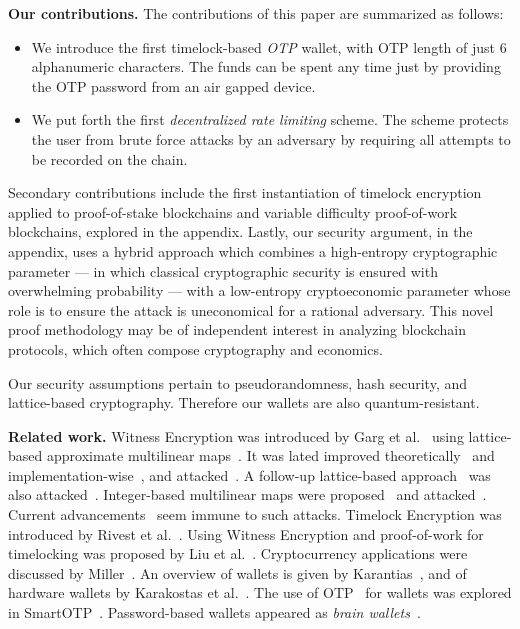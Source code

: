\noindent
\textbf{Our contributions.}
The contributions of this paper are summarized as follows:

\begin{itemize}
  \item We introduce the first timelock-based \emph{OTP} wallet, with OTP length of
        just 6 alphanumeric characters. The funds can be spent any time just by
        providing the OTP password from an air gapped device.
  \item We put forth the first
        \emph{decentralized rate limiting} scheme. The scheme protects the user
        from brute force attacks by an adversary by requiring all attempts to
        be recorded on the chain.
\end{itemize}

Secondary contributions include the first instantiation of timelock encryption applied
to proof-of-stake blockchains and variable difficulty proof-of-work blockchains, explored
in the appendix. Lastly,
our security argument, in the appendix, uses a hybrid approach which combines a high-entropy
cryptographic parameter --- in which classical cryptographic security is ensured with overwhelming
probability --- with a low-entropy cryptoeconomic parameter whose role is to ensure the
attack is uneconomical for a rational adversary. This novel proof methodology may be of
independent interest in analyzing blockchain protocols, which often compose cryptography
and economics.

Our security assumptions pertain to pseudorandomness, hash security, and lattice-based cryptography.
Therefore our wallets are also quantum-resistant.

\noindent
\textbf{Related work.}
Witness Encryption was introduced by Garg et al.~\cite{STOC:GGSW13}
using lattice-based approximate multilinear
maps~\cite{EC:GarGenHal13}. It was lated
improved theoretically~\cite{EC:LanSteSte14} and implementation-wise~\cite{AC:ACLL15},
and attacked~\cite{EC:CHLRS15,EC:HuJia16,PKC:CLLT17,C:CGHLMM15,C:AlbBaiDuc16,EPRINT:CheJeoLee16}.
A follow-up lattice-based approach~\cite{TCC:GenGorHal15} was also attacked~\cite{C:CLLT16}.
Integer-based multilinear maps were proposed~\cite{C:CorLepTib13,C:CorLepTib15} and
attacked~\cite{EC:CHLRS15,EPRINT:MinFou15,EPRINT:CheLeeRyu15}.
Current advancements~\cite{ma2018mmap} seem immune to such attacks.
Timelock Encryption was introduced by Rivest et al.~\cite{timelock}.
Using Witness Encryption and proof-of-work for timelocking was proposed by Liu et
al.~\cite{timelock-bitcoin}. Cryptocurrency applications
were discussed by Miller~\cite{miller-timelock}.
An overview of wallets is given by Karantias~\cite{wallet-taxonomy}, and
of hardware wallets by Karakostas et al.~\cite{hardware-wallets}.
The use of OTP~\cite{rfc6238,rfc4226} for wallets was explored in SmartOTP~\cite{smartotp}.
Password-based wallets appeared as \emph{brain wallets}~\cite{brain-drain}.

